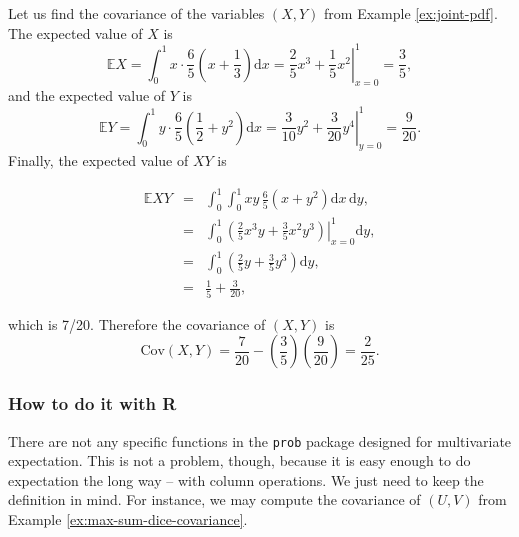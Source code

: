 \documentclass[]{book}
\newenvironment{Shaded}{\begin{snugshade}}{\end{snugshade}}
\newcommand{\KeywordTok}[1]{\textcolor[rgb]{0.13,0.29,0.53}{\textbf{{#1}}}}
\newcommand{\StringTok}[1]{\textcolor[rgb]{0.31,0.60,0.02}{{#1}}}
\newcommand{\NormalTok}[1]{{#1}}
\numberwithin{equation}{chapter}
\numberwithin{figure}{chapter}
\theoremstyle{plain}
\theoremstyle{definition}
\theoremstyle{remark}
\theoremstyle{definition}
\theoremstyle{definition}
\theoremstyle{remark}
\let\BeginKnitrBlock\begin \let\EndKnitrBlock\end
\begin{document}
\bigskip

\BeginKnitrBlock{example}
\protect\hypertarget{ex:unnamed-chunk-202}{}{\label{ex:unnamed-chunk-202}}Let
us find the covariance of the variables \((X,Y)\) from Example
\ref{ex:joint-pdf}. The expected value of \(X\) is \[ \mathbb{E}
X=\int_{0}^{1}x\cdot\frac{6}{5}\left(x+\frac{1}{3}\right)\mathrm{d}
x=\left.\frac{2}{5}x^{3}+\frac{1}{5}x^{2}\right|_{x=0}^{1}=\frac{3}{5},
\] and the expected value of \(Y\) is \[ \mathbb{E}
Y=\int_{0}^{1}y\cdot\frac{6}{5}\left(\frac{1}{2}+y^{2}\right)\mathrm{d}
x=\left.\frac{3}{10}y^{2}+\frac{3}{20}y^{4}\right|_{y=0}^{1}=\frac{9}{20}.
\] Finally, the expected value of \(XY\) is

\begin{eqnarray*}
\mathbb{E} XY & = & \int_{0}^{1}\int_{0}^{1}xy\,\frac{6}{5}\left(x+y^{2}\right)\mathrm{d} x\,\mathrm{d} y,\\
 & = & \int_{0}^{1}\left.\left(\frac{2}{5}x^{3}y+\frac{3}{5}x^{2}y^{3}\right)\right|_{x=0}^{1}\mathrm{d} y,\\
 & = & \int_{0}^{1}\left(\frac{2}{5}y+\frac{3}{5}y^{3}\right)\mathrm{d} y,\\
 & = & \frac{1}{5}+\frac{3}{20},
\end{eqnarray*}

which is 7/20. Therefore the covariance of \((X,Y)\) is \[
\mbox{Cov}(X,Y)=\frac{7}{20}-\left(\frac{3}{5}\right)\left(\frac{9}{20}\right)=\frac{2}{25}.
\]
\EndKnitrBlock{example}

\subsubsection{How to do it with R}\label{how-to-do-it-with-r-21}

There are not any specific functions in the \texttt{prob} package
\autocite{prob} designed for multivariate expectation. This is not a
problem, though, because it is easy enough to do expectation the long
way -- with column operations. We just need to keep the definition in
mind. For instance, we may compute the covariance of \((U,V)\) from
Example \ref{ex:max-sum-dice-covariance}.

\begin{Shaded}
\end{Shaded}
\end{document}
